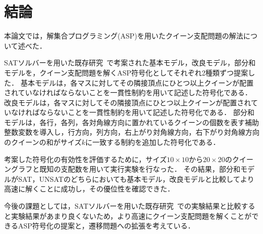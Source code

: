 \chapter{結論}\label{chap:conclusion}

本論文では，解集合プログラミング(ASP)を用いたクイーン支配問題の解法について述べた．

SATソルバーを用いた既存研究~\cite{yamamoto21}で考案された基本モデル，改良モデル，部分和モデルを，クイーン支配問題を解くASP符号化としてそれぞれ2種類ずつ提案した．
基本モデルは，各マスに対してその隣接頂点にひとつ以上クイーンが配置されていなければならないことを一貫性制約を用いて記述した符号化である．
改良モデルは，各マスに対してその隣接頂点にひとつ以上クイーンが配置されていなければならないことを一貫性制約を用いて記述した符号化である．
部分和モデルは，各行，各列，各対角線方向に置かれているクイーンの個数を表す補助整数変数を導入し，行方向，列方向，右上がり対角線方向，右下がり対角線方向のクイーンの和がサイズ$k$に一致する制約を追加した符号化である．

考案した符号化の有効性を評価するために，サイズ$10 \times 10$から$20 \times 20$のクイーングラフと既知の支配数を用いて実行実験を行なった．
その結果，部分和モデルがSAT，UNSATのどちらにおいても基本モデル，改良モデルと比較してより高速に解くことに成功し，その優位性を確認できた．

今後の課題としては，SATソルバーを用いた既存研究~\cite{yamamoto21}での実験結果と比較すると実験結果があまり良くないため，より高速にクイーン支配問題を解くことができるASP符号化の提案と，遷移問題への拡張を考えている．

